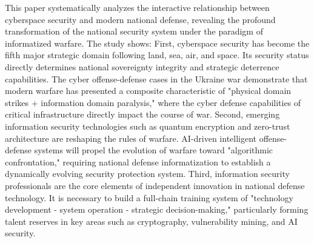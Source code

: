 \documentclass[12pt, a4paper]{article}
\begin{document}
This paper systematically analyzes the interactive relationship between cyberspace security and modern national defense, revealing the profound transformation of the national security system under the paradigm of informatized warfare. The study shows: First, cyberspace security has become the fifth major strategic domain following land, sea, air, and space. Its security status directly determines national sovereignty integrity and strategic deterrence capabilities. The cyber offense-defense cases in the Ukraine war demonstrate that modern warfare has presented a composite characteristic of "physical domain strikes + information domain paralysis," where the cyber defense capabilities of critical infrastructure directly impact the course of war. Second, emerging information security technologies such as quantum encryption and zero-trust architecture are reshaping the rules of warfare. AI-driven intelligent offense-defense systems will propel the evolution of warfare toward "algorithmic confrontation," requiring national defense informatization to establish a dynamically evolving security protection system. Third, information security professionals are the core elements of independent innovation in national defense technology. It is necessary to build a full-chain training system of "technology development - system operation - strategic decision-making," particularly forming talent reserves in key areas such as cryptography, vulnerability mining, and AI security.

\nocite{*}

\end{document}
